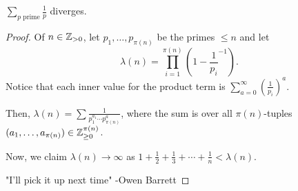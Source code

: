 \documentclass{article}
\begin{document}
\begin{theorem}
    $\sum_{p \text{ prime}} \frac{1}{p}$ diverges.
\end{theorem}

\begin{proof}
    Of $n \in \mathbb Z_{> 0}$, let $p_1, \ldots, p_{\pi(n)}$ be the primes $\leq n$ and let \[\lambda(n) = \prod_{i = 1}^{\pi(n)} \left(1 - \frac{1}{p_i}^{-1}\right).\] Notice that each inner value for the product term is $\sum_{a = 0}^\infty \left(\frac{1}{p_i}\right)^a$. 

    Then, $\lambda(n) = \sum \frac{1}{p_1^{a_1} \cdots p_{\pi(n)}^a}$, where the sum is over all $\pi(n)$-tuples $(a_1, \ldots, a_{\pi(n)}) \in \mathbb Z_{\geq 0}^{\pi(n)}$.

    Now, we claim $\lambda(n) \to \infty$ as $1 + \frac{1}{2} + \frac{1}{3} + \cdots + \frac{1}{n} < \lambda(n)$.

    "I'll pick it up next time" -Owen Barrett
\end{proof}
\end{document}
